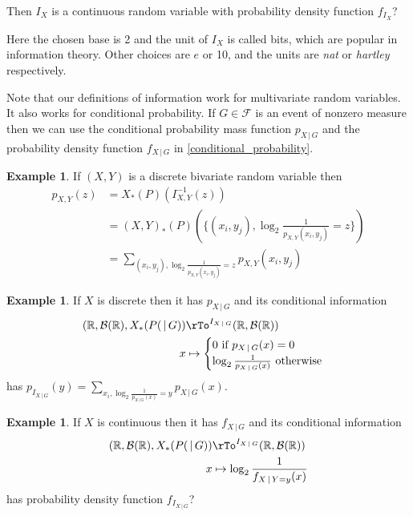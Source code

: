 \documentclass[12pt]{amsart}
\theoremstyle{definition}
\newtheorem{example}[theorem]{Example}
\begin{document}
Then $I_X$ is a continuous random variable with probability density function $f_{I_X}$?

Here the chosen base is 2 and the unit of $I_X$ is called bits, which are popular in information theory. Other choices are $e$ or 10, and the units are {\it nat} or {\it hartley} respectively.

Note that our definitions of information work for multivariate random variables. It also works for conditional probability. If $G \in \mathcal{F}$ is an event of nonzero measure then we can use the conditional probability mass function $p_{X \,|\, G}$ and the probability density function $f_{X \,|\, G}$ in \ref{conditional_probability}.

\begin{example} If $(X, Y)$ is a discrete bivariate random variable then
\begin{align*}
p_{X, Y}(z) & = X_*(P)(I_{X, Y}^{-1}(z)) \\
 & = (X, Y)_*(P)( \{(x_i, y_j), \log_2 \frac{1}{p_{X, Y}(x_i, y_j)} = z\}) \\
 & = \sum\limits_{(x_i, y_j), \log_2 \frac{1}{p_{X, Y}(x_i, y_j)} = z} p_{X, Y}(x_i, y_j)
\end{align*}
\end{example}

\begin{example} If $X$ is discrete then it has $p_{X \,|\, G}$ and its conditional information
\begin{align*}
(\mathbb{R}, \mathcal{B}(\mathbb{R}), X_*(P( \,|\, G)) & \rTo^{I_{X \,|\, G}} (\mathbb{R}, \mathcal{B}(\mathbb{R})) \\
x & \mapsto \begin{cases} 0 \text{ if } p_{X \,|\, G}(x) = 0 \\ \log_2 \frac{1}{p_{X \,|\, G}(x)} \text{ otherwise} \end{cases}
\end{align*}
has $p_{I_{X \,|\, G}}(y) = \sum\limits_{x_i, \log_2 \frac{1}{p_{X \,|\, G}(x)} = y} p_{X \,|\, G}(x)$.
\end{example}

\begin{example} If $X$ is continuous then it has $f_{X \,|\, G}$ and its conditional information
\begin{align*}
(\mathbb{R}, \mathcal{B}(\mathbb{R}), X_*(P( \,|\, G)) & \rTo^{I_{X \,|\, G}} (\mathbb{R}, \mathcal{B}(\mathbb{R})) \\
x & \mapsto \log_2 \frac{1}{f_{X \,|\, Y = y}(x)}
\end{align*}
has probability density function $f_{I_{X \,|\, G}}$?
\end{example}
\end{document}
